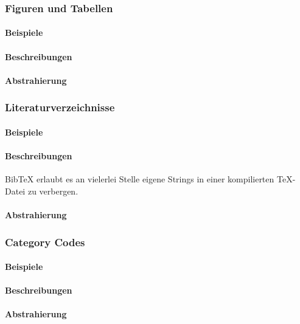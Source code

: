 \subsubsection{Figuren und Tabellen}\label{problems:advanced:tables}
\paragraph*{Beispiele}
\paragraph*{Beschreibungen}
\paragraph*{Abstrahierung}

\subsubsection{Literaturverzeichnisse}\label{problems:advanced:bibtex}
\paragraph*{Beispiele}
\paragraph*{Beschreibungen}
Bib\TeX{} erlaubt es an vielerlei Stelle eigene Strings in einer kompilierten \TeX{}-Datei zu verbergen.
\paragraph*{Abstrahierung}


\subsubsection{Category Codes}\label{problems:advanced:catcode}
\paragraph*{Beispiele}
\paragraph*{Beschreibungen}
\paragraph*{Abstrahierung}


